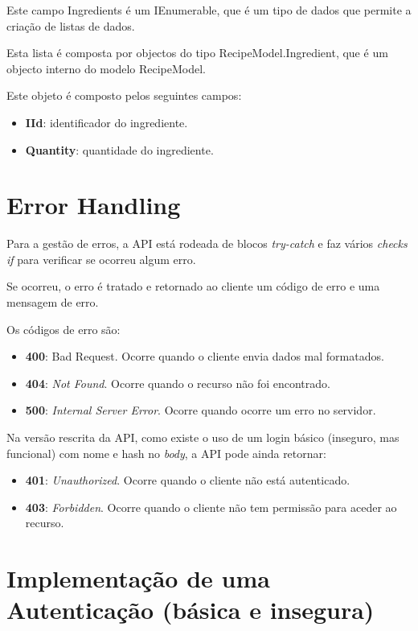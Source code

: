 Este campo Ingredients é um IEnumerable, que é um tipo de dados que permite a criação de listas de dados.

Esta lista é composta por objectos do tipo RecipeModel.Ingredient, que é um objecto interno do modelo RecipeModel.

Este objeto é composto pelos seguintes campos:

\begin{itemize}
  \item \textbf{IId}: identificador do ingrediente.
  \item \textbf{Quantity}: quantidade do ingrediente.
\end{itemize}
\section{Error Handling}

Para a gestão de erros, a API está rodeada de blocos \textit{try-catch} e faz vários \textit{checks if} para verificar se ocorreu algum erro.

Se ocorreu, o erro é tratado e retornado ao cliente um código de erro e uma mensagem de erro.

Os códigos de erro são:

\begin{itemize}
  \item \textbf{400}: Bad Request. Ocorre quando o cliente envia dados mal formatados.
  \item \textbf{404}: \textit{Not Found}. Ocorre quando o recurso não foi encontrado.
  \item \textbf{500}: \textit{Internal Server Error}. Ocorre quando ocorre um erro no servidor.
\end{itemize}

Na versão rescrita da API, como existe o uso de um login básico
(inseguro, mas funcional) com nome e hash no \textit{body}, a API pode
ainda retornar:

\begin{itemize}
  \item \textbf{401}: \textit{Unauthorized}. Ocorre quando o cliente não está autenticado.
  \item \textbf{403}: \textit{Forbidden}. Ocorre quando o cliente não tem permissão para aceder ao recurso.
\end{itemize}

\section{Implementação de uma Autenticação (básica e
  insegura)}

